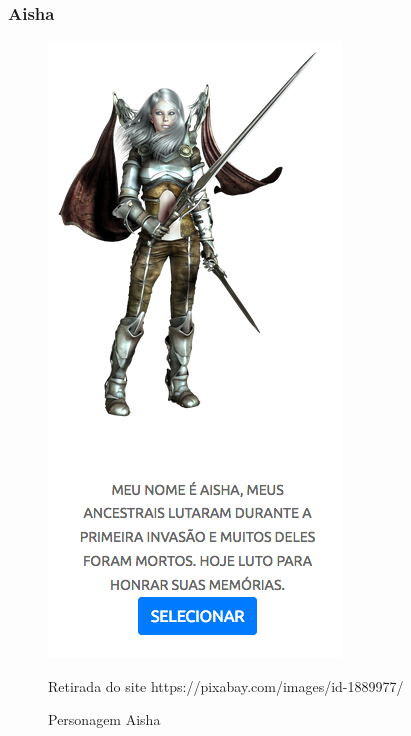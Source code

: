 \subsubsection{Aisha}
\begin{figure}[h]
	\centering
	\includegraphics[keepaspectratio=true,scale=0.6]{figuras/aisha.png}
	\caption{Personagem Aisha}
	Retirada do site https://pixabay.com/images/id-1889977/
	\label{aisha}
\end{figure}

\clearpage

